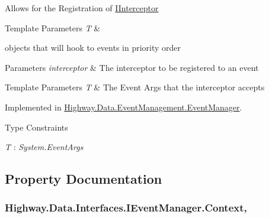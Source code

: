 Allows for the Registration of \hyperlink{interface_highway_1_1_data_1_1_interfaces_1_1_i_interceptor-g}{I\-Interceptor}
\begin{DoxyTemplParams}{Template Parameters}
{\em T} & \\
\hline
\end{DoxyTemplParams}
objects that will hook to events in priority order 


\begin{DoxyParams}{Parameters}
{\em interceptor} & The interceptor to be registered to an event\\
\hline
\end{DoxyParams}

\begin{DoxyTemplParams}{Template Parameters}
{\em T} & The Event Args that the interceptor accepts\\
\hline
\end{DoxyTemplParams}


Implemented in \hyperlink{class_highway_1_1_data_1_1_event_management_1_1_event_manager_afef19b17ec8fa17764a1cd24f5569f34}{Highway.\-Data.\-Event\-Management.\-Event\-Manager}.

\begin{Desc}
\item[Type Constraints]\begin{description}
\item[{\em T} : {\em System.\-Event\-Args}]\end{description}
\end{Desc}


\subsection{Property Documentation}
\hypertarget{interface_highway_1_1_data_1_1_interfaces_1_1_i_event_manager_aae163759719833dca07513b02efbafa8}{
\subsubsection[{Context}]{ Highway.\-Data.\-Interfaces.\-I\-Event\-Manager.\-Context\hspace{0.3cm}{\ttfamily [get]}, {\ttfamily [set]}}}\label{interface_highway_1_1_data_1_1_interfaces_1_1_i_event_manager_aae163759719833dca07513b02efbafa8}


